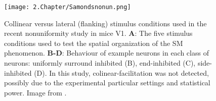\begin{figure}[H]
\center
\texttt{[image: 2.Chapter/Samondsnonun.png]}
\caption{Collinear versus lateral (flanking) stimulus conditions used in the recent nonuniformity study in mice V1.
\newline \textbf{A}: The five stimulus conditions used to test the spatial organization of the SM phenomenon.
\newline \textbf{B-D}: Behaviour of example neurons in each class of neurons: uniformly surround inhibited (B), end-inhibited (C), side-inhibited (D). In this study, colinear-facilitation was not detected, possibly due to the experimental particular settings and statistical power.
\newline \newline \tiny{Image from \cite{Samonds2017}.}}
\label{samondsnonun}
\end{figure}